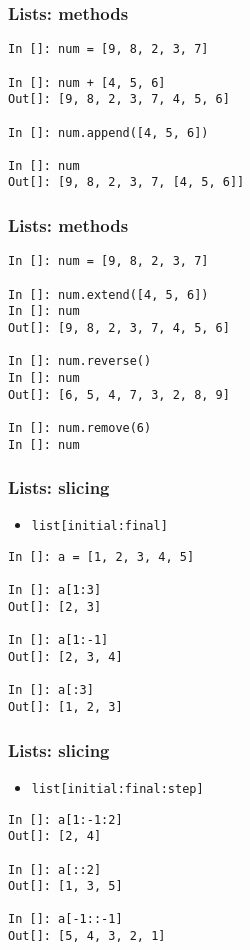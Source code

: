 \documentclass[14pt,compress]{beamer}
\newcommand{\typ}[1]{\lstinline{#1}}
\begin{document}
\begin{frame}[fragile]
  \frametitle{Lists: methods}
  \begin{lstlisting}
In []: num = [9, 8, 2, 3, 7]

In []: num + [4, 5, 6]
Out[]: [9, 8, 2, 3, 7, 4, 5, 6]

In []: num.append([4, 5, 6])

In []: num
Out[]: [9, 8, 2, 3, 7, [4, 5, 6]]
  \end{lstlisting}
\end{frame}

\begin{frame}[fragile]
  \frametitle{Lists: methods}
  \begin{lstlisting}
In []: num = [9, 8, 2, 3, 7]

In []: num.extend([4, 5, 6])
In []: num
Out[]: [9, 8, 2, 3, 7, 4, 5, 6]

In []: num.reverse()
In []: num
Out[]: [6, 5, 4, 7, 3, 2, 8, 9]

In []: num.remove(6)
In []: num
  \end{lstlisting}
\end{frame}

\begin{frame}[fragile]
  \frametitle{Lists: slicing}
  \begin{itemize}
    \item \typ{list[initial:final]}
  \end{itemize}
\begin{lstlisting}
In []: a = [1, 2, 3, 4, 5]

In []: a[1:3]
Out[]: [2, 3]

In []: a[1:-1]
Out[]: [2, 3, 4]

In []: a[:3]
Out[]: [1, 2, 3]
\end{lstlisting}
\end{frame}

\begin{frame}[fragile]
  \frametitle{Lists: slicing}
  \begin{itemize}
    \item \typ{list[initial:final:step]}
  \end{itemize}
\begin{lstlisting}
In []: a[1:-1:2]
Out[]: [2, 4]

In []: a[::2]
Out[]: [1, 3, 5]

In []: a[-1::-1]
Out[]: [5, 4, 3, 2, 1]
\end{lstlisting}
\end{frame}
\end{document}
